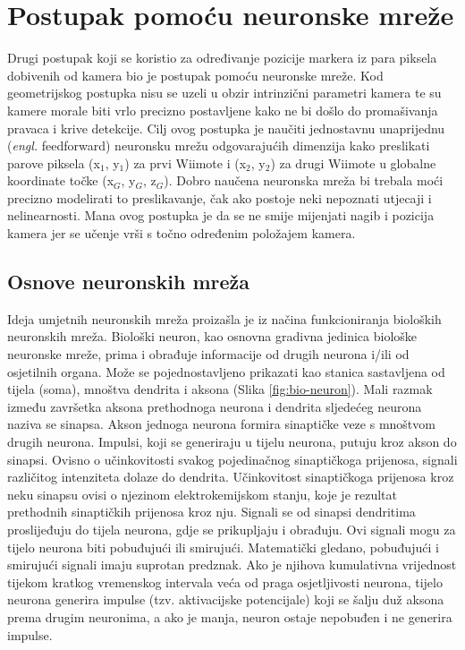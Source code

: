\documentclass[times, utf8, diplomski]{fer}
\begin{document}
\section{Postupak pomoću neuronske mreže}

Drugi postupak koji se koristio za određivanje pozicije markera iz para piksela dobivenih od kamera bio je postupak pomoću neuronske mreže. Kod geometrijskog postupka nisu se uzeli u obzir intrinzični parametri kamera te su kamere morale biti vrlo precizno postavljene kako ne bi došlo do promašivanja pravaca i krive detekcije. Cilj ovog postupka je naučiti jednostavnu unaprijednu (\textit{engl.} feedforward) neuronsku mrežu odgovarajućih dimenzija kako preslikati parove piksela (x$_1$, y$_1$) za prvi Wiimote i (x$_2$, y$_2$) za drugi Wiimote u globalne koordinate točke (x$_G$, y$_G$, z$_G$). Dobro naučena neuronska mreža bi trebala moći precizno modelirati to preslikavanje, čak ako postoje neki nepoznati utjecaji i nelinearnosti. Mana ovog postupka je da se ne smije mijenjati nagib i pozicija kamera jer se učenje vrši s točno određenim položajem kamera.

\subsection{Osnove neuronskih mreža}

Ideja umjetnih neuronskih mreža proizašla je iz načina funkcioniranja bioloških neuronskih mreža. Biološki neuron, kao osnovna gradivna jedinica biološke neuronske mreže, prima i obrađuje informacije od drugih neurona i/ili od osjetilnih organa. Može se pojednostavljeno prikazati kao stanica sastavljena od tijela (soma), mnoštva dendrita i aksona (Slika \ref{fig:bio-neuron}). Mali razmak između završetka aksona prethodnoga neurona i dendrita sljedećeg neurona naziva se sinapsa. Akson jednoga neurona formira sinaptičke veze s mnoštvom drugih neurona. Impulsi, koji se generiraju u tijelu neurona, putuju kroz akson do sinapsi. Ovisno o učinkovitosti svakog pojedinačnog sinaptičkoga prijenosa, signali različitog intenziteta dolaze do dendrita. Učinkovitost sinaptičkoga prijenosa kroz neku sinapsu ovisi o njezinom elektrokemijskom stanju, koje je rezultat prethodnih sinaptičkih prijenosa kroz nju. Signali se od sinapsi dendritima proslijeđuju do tijela neurona, gdje se prikupljaju i obrađuju. Ovi signali mogu za tijelo neurona biti pobuđujući ili smirujući. Matematički gledano, pobuđujući i smirujući signali imaju suprotan predznak. Ako je njihova kumulativna vrijednost tijekom kratkog vremenskog intervala veća od praga osjetljivosti neurona, tijelo neurona generira impulse (tzv. aktivacijske potencijale) koji se šalju duž aksona prema drugim neuronima, a ako je manja, neuron ostaje nepobuđen i ne generira impulse. 
\end{document}
